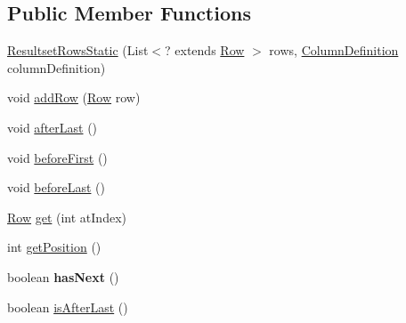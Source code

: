 \subsection*{Public Member Functions}
\begin{DoxyCompactItemize}
\item 
\mbox{\hyperlink{classcom_1_1mysql_1_1cj_1_1protocol_1_1a_1_1result_1_1_resultset_rows_static_af47b5dc1c99f77b340a0a7f14b9b261e}{Resultset\+Rows\+Static}} (List$<$? extends \mbox{\hyperlink{interfacecom_1_1mysql_1_1cj_1_1result_1_1_row}{Row}} $>$ rows, \mbox{\hyperlink{interfacecom_1_1mysql_1_1cj_1_1protocol_1_1_column_definition}{Column\+Definition}} column\+Definition)
\item 
void \mbox{\hyperlink{classcom_1_1mysql_1_1cj_1_1protocol_1_1a_1_1result_1_1_resultset_rows_static_a4546e3ad8ce7f65d7c37d306ec4a1e48}{add\+Row}} (\mbox{\hyperlink{interfacecom_1_1mysql_1_1cj_1_1result_1_1_row}{Row}} row)
\item 
void \mbox{\hyperlink{classcom_1_1mysql_1_1cj_1_1protocol_1_1a_1_1result_1_1_resultset_rows_static_a2714df97d4c52ca2993214815e6d5594}{after\+Last}} ()
\item 
void \mbox{\hyperlink{classcom_1_1mysql_1_1cj_1_1protocol_1_1a_1_1result_1_1_resultset_rows_static_a0621988f2c4896700500decf7b6298a2}{before\+First}} ()
\item 
void \mbox{\hyperlink{classcom_1_1mysql_1_1cj_1_1protocol_1_1a_1_1result_1_1_resultset_rows_static_ae4eeeb6d930a55f44a5c80338115ef96}{before\+Last}} ()
\item 
\mbox{\hyperlink{interfacecom_1_1mysql_1_1cj_1_1result_1_1_row}{Row}} \mbox{\hyperlink{classcom_1_1mysql_1_1cj_1_1protocol_1_1a_1_1result_1_1_resultset_rows_static_a142d0e620806f94e5e35b761587bda0d}{get}} (int at\+Index)
\item 
int \mbox{\hyperlink{classcom_1_1mysql_1_1cj_1_1protocol_1_1a_1_1result_1_1_resultset_rows_static_a3177c1c1350ee04c5d9ab5130e40e97f}{get\+Position}} ()
\item 
\mbox{\label{classcom_1_1mysql_1_1cj_1_1protocol_1_1a_1_1result_1_1_resultset_rows_static_a286e065a006767e966320c2ab6d9d08d}} 
boolean {\bfseries has\+Next} ()
\item 
boolean \mbox{\hyperlink{classcom_1_1mysql_1_1cj_1_1protocol_1_1a_1_1result_1_1_resultset_rows_static_a7b010d9bacc8bb948e66a76d4ef4e0d4}{is\+After\+Last}} ()
\item 

\end{DoxyCompactItemize}
